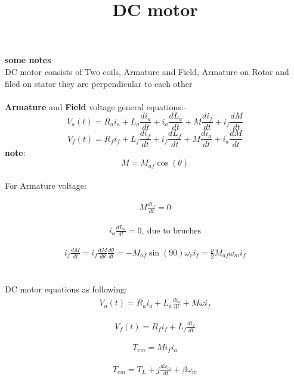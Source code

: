 \documentclass[a4paper,11pt]{article}
\begin{document}
\title{DC motor}
\maketitle

{\bf some notes}
\\
DC motor consists of Two coils, Armature and Field, Armature on Rotor and filed on stator they are perpendicular to each other
\\
\\
{\bf Armature} and {\bf Field} voltage general equations:- 
\[ V_a(t)=R_a i_a+L_a \frac{d i_a}{dt} + i_a \frac{d L_a}{dt} +M \frac{d i_f}{dt}+i_f \frac{dM}{dt} \]
\[ V_f(t)=R_f i_f+L_f \frac{d i_f}{dt} + i_f \frac{d L_f}{dt} +M \frac{d i_a}{dt}+i_a \frac{dM}{dt} \]
{\bf note}: \[ M=M_{af} \cos ( \theta )\] 
\\
For Armature voltage:

\begin{align*}
    M \frac{d i_f}{dt} = 0
\end{align*}

\begin{align*}
    i_a \frac{d L_a}{dt} = 0, \: \text{due to bruches} 
\end{align*}

\begin{align*}
i_f \frac{dM}{dt} = i_f \frac{dM}{d \theta} \frac{d \theta}{dt} = - M_{af} \sin(90) \omega_r i_f=\frac{p}{2} M_{af} \omega_m i_f 
\end{align*}
\\
\\
DC motor equations as following:
\begin{align}
    V_a(t)=R_a i_a + L_a \frac{d i_a}{dt} +M \omega i_f
\end{align}

\begin{align}
    V_f(t)=R_f i_f + L_f \frac{d i_f}{dt}
\end{align}

\begin{align}
    T_{em} = M i_f i_a
\end{align}

\begin{align}
    T_{em} = T_L + j \frac{d \omega_m}{dt} + \beta \omega_m
\end{align}
\end{document}
